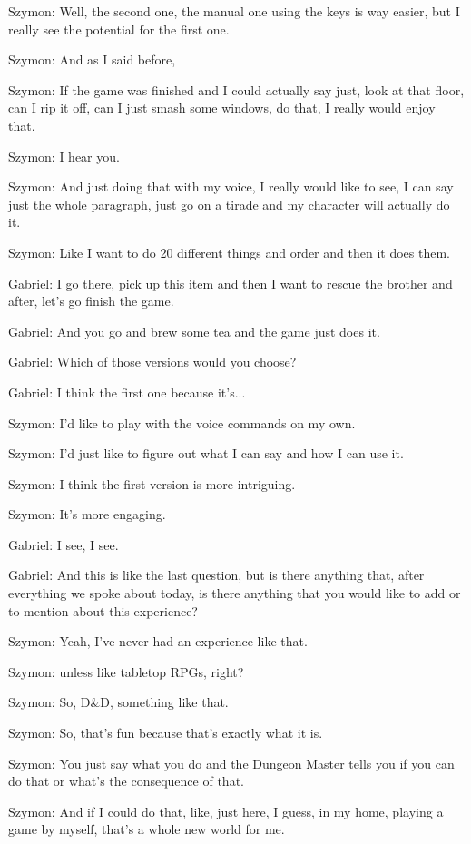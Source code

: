 Szymon: Well, the second one, the manual one using the keys is way easier, but I really see the potential for the first one.

Szymon: And as I said before,

Szymon: If the game was finished and I could actually say just, look at that floor, can I rip it off, can I just smash some windows, do that, I really would enjoy that.

Szymon: I hear you.

Szymon: And just doing that with my voice, I really would like to see, I can say just the whole paragraph, just go on a tirade and my character will actually do it.

Szymon: Like I want to do 20 different things and order and then it does them.

Gabriel: I go there, pick up this item and then I want to rescue the brother and after, let's go finish the game.

Gabriel: And you go and brew some tea and the game just does it.

Gabriel: Which of those versions would you choose?

Gabriel: I think the first one because it's...

Szymon: I'd like to play with the voice commands on my own.

Szymon: I'd just like to figure out what I can say and how I can use it.

Szymon: I think the first version is more intriguing.

Szymon: It's more engaging.

Gabriel: I see, I see.

Gabriel: And this is like the last question, but is there anything that, after everything we spoke about today, is there anything that you would like to add or to mention about this experience?

Szymon: Yeah, I've never had an experience like that.

Szymon: unless like tabletop RPGs, right?

Szymon: So, D&D, something like that.

Szymon: So, that's fun because that's exactly what it is.

Szymon: You just say what you do and the Dungeon Master tells you if you can do that or what's the consequence of that.

Szymon: And if I could do that, like, just here, I guess, in my home, playing a game by myself, that's a whole new world for me.

